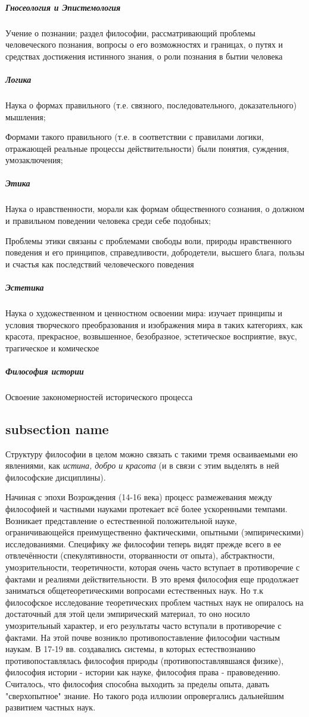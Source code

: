 \documentclass[a4paper, 12pt]{article}
\theoremstyle{plain} %
\theoremstyle{definition} %
\theoremstyle{remark} %
\begin{document}
\subparagraph{Гносеология и Эпистемология}
    Учение о познании; раздел философии, рассматривающий проблемы человеческого познания, вопросы о его возможностях и границах, о путях и средствах достижения истинного знания, о роли познания в бытии человека

\subparagraph{Логика}
    Наука о формах правильного (т.е. связного, последовательного, доказательного) мышления;

     Формами такого правильного (т.е. в соответствии с правилами логики, отражающей реальные процессы действительности) были понятия, суждения, умозаключения;
\subparagraph{Этика}
    Наука о нравственности, морали как формам общественного сознания, о должном и правильном поведении человека среди себе подобных;

    Проблемы этики связаны с проблемами свободы воли, природы нравственного поведения и его принципов, справедливости, добродетели, высшего блага, пользы и счастья как последствий человеческого поведения

\subparagraph{Эстетика}
    Наука о художественном и ценностном освоении мира: изучает принципы и условия творческого преобразования и
    изображения мира в таких категориях, как красота, прекрасное, возвышенное, безобразное, эстетическое восприятие, вкус, трагическое и комическое

\subparagraph{Философия истории} Освоение закономерностей исторического процесса

\subsection{subsection name}
Структуру философии в целом можно связать с такими тремя осваиваемыми ею явлениями, как \emph{истина, добро и красота} (и в связи с этим выделять в ней философские дисциплины).

\vspace{1em}
Начиная с эпохи Возрождения (14-16 века) процесс размежевания между философией и частными науками протекает всё более ускоренными темпами.
Возникает представление о естественной положительной науке, ограничивающейся преимущественно фактическими, опытными (эмпирическими) исследованиями. Специфику же философии теперь видят прежде всего в ее отвлечённости (спекулятивности, оторванности от опыта), абстрактности, умозрительности, теоретичности, которая очень часто вступает в противоречие с фактами и реалиями действительности. В это время философия еще продолжает заниматься общетеоретическими вопросами естественных наук. Но т.к философское исследование теоретических проблем частных наук не опиралось на достаточный для этой цели эмпирический материал, то оно носило умозрительный характер, и его результаты часто вступали в противоречие с фактами. На этой почве возникло противопоставление философии частным наукам. В 17-19 вв. создавались системы, в которых естествознанию противопоставлялась философия природы (противопоставлявшаяся физике), философия истории - истории как науке, философия права - правоведению. Считалось, что философия способна выходить за пределы опыта, давать "сверхопытное" знание. Но такого рода иллюзии опровергались дальнейшим развитием частных наук.
\end{document}
